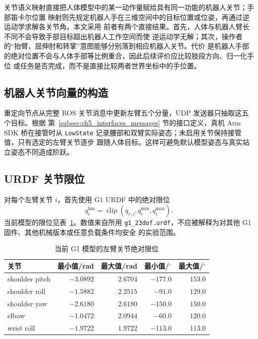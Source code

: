 关节语义映射直接把人体模型中的某一动作量赋给具有同一功能的机器人关节；手部笛卡尔位置
映射则先规定机器人手在三维空间中的目标位置或位姿，再通过逆运动学求解各关节角。本文采用
前者有两个直接结果。首先，人体与机器人臂长不同不会导致手部目标超出机器人工作空间而使
逆运动学无解；其次，操作者的“抬臂、屈伸肘和转掌”意图能够分别落到相应机器人关节。代价
是机器人手部的绝对位置不会与人体手部等比例重合，因此后续评价应比较肢段方向、归一化手位
或任务是否完成，而不是直接比较两者世界坐标中的手位置。

\subsection{机器人关节向量的构造}
\label{subsec:ch5_full_joint_vector}

重定向节点从完整 ROS 关节消息中更新左臂五个分量，UDP 发送器只抽取这五个目标。根据
第~\ref{subsec:ch5_interfaces_messages} 节的接口定义，真机 Arm SDK 桥在接管时从
\texttt{LowState} 记录腰部和双臂实际姿态；未启用关节保持接管值，只有选定的左臂关节逐步
跟随人体目标。这样可避免默认模型姿态与真实站立姿态不同造成阶跃。

\subsection{URDF 关节限位}
\label{subsec:ch5_urdf_limits}

对每个左臂关节 $i$，首先使用 G1 URDF 中的绝对限位
\begin{equation}
  q_i^{\mathrm{lim}}=
  \operatorname{clip}(q_{r,i},q_i^{\min},q_i^{\max}).
  \label{eq:ch5_urdf_clipping}
\end{equation}
当前模型的限位见表~\ref{tab:ch5_g1_joint_limits}。数值来自所用
\texttt{g1\_23dof.urdf}，不应被解释为对其他 G1 固件、其他机械版本或任意负载条件均安全
的实验范围。

\begin{table}[htbp]
  \centering
  \caption{当前 G1 模型的左臂关节绝对限位}
  \label{tab:ch5_g1_joint_limits}
  \begin{tabular}{@{}lrrrr@{}}
    \toprule
    关节 & 最小值/rad & 最大值/rad & 最小值/$^\circ$ & 最大值/$^\circ$ \\
    \midrule
    shoulder pitch & $-3.0892$ & $2.6704$ & $-177.0$ & $153.0$ \\
    shoulder roll  & $-1.5882$ & $2.2515$ & $-91.0$ & $129.0$ \\
    shoulder yaw   & $-2.6180$ & $2.6180$ & $-150.0$ & $150.0$ \\
    elbow          & $-1.0472$ & $2.0944$ & $-60.0$ & $120.0$ \\
    wrist roll     & $-1.9722$ & $1.9722$ & $-113.0$ & $113.0$ \\
    \bottomrule
  \end{tabular}
\end{table}

